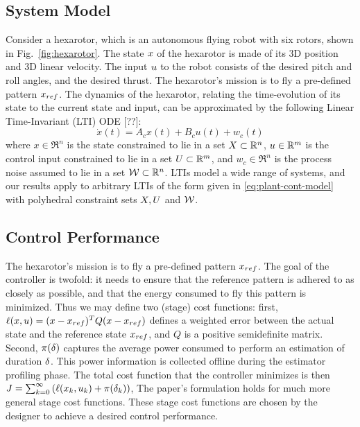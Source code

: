 \subsection{System Model}
\label{formulation}

Consider a hexarotor, which is an autonomous flying robot with six rotors, shown in Fig.~\ref{fig:hexarotor}.
The state $x$ of the hexarotor is made of its 3D position and 3D linear velocity.
The input $u$ to the robot consists of the desired pitch and roll angles, and the desired thrust.
The hexarotor's mission is to fly a pre-defined pattern $x_{ref}$. 
The dynamics of the hexarotor, relating the time-evolution of its state to the current state and input, can be approximated by the following Linear Time-Invariant (LTI) ODE [??]:
\begin{equation}
\dot{x}(t) = A_{c}x(t)+B_{c}u(t)+w_{c}(t)  \label{eq:plant-cont-model}
\end{equation}
where $x\in \Re^{n}$ is the state constrained to lie in a set $X \subset \mathbb{R}^n$, 
$u\in\mathbb{R}^{m}$ is the control input constrained to lie in a set $U \subset \mathbb{R}^m$,
and $w_{c}\in\Re^{n}$ is the process noise assumed to lie in a set $\mathcal{W} \subset \mathbb{R}^n$. 
LTIs model a wide range of systems, and our results apply to arbitrary LTIs of the form given in \eqref{eq:plant-cont-model} with polyhedral constraint sets $X,U$ and $\mathcal{W}$.

\subsection{Control Performance}
The hexarotor's mission is to fly a pre-defined pattern $x_{ref}$. 
The goal of the controller is twofold: it needs to ensure that the reference pattern is adhered to as closely as possible, and that the energy consumed to fly this pattern is minimized.
Thus we may define two (stage) cost functions: first, $\ell(x, u) = (x - x_{ref})^TQ(x - x_{ref})$ defines a weighted error between the actual state and the reference state $x_{ref}$, and $Q$ is a positive semidefinite matrix.
Second, $\pi(\delta)$ captures the average power consumed to perform an estimation of duration $\delta$. 
This power information is collected offline during the estimator profiling phase.
The total cost function that the controller minimizes is then
\(
J=\sum_{k=0}^{\infty}\left(\ell(x_{k},u_{k})+\pi(\delta_k)\right)
\),
The paper's formulation holds for much more general stage cost functions.
These stage cost functions are chosen by the designer to achieve a desired control performance.

